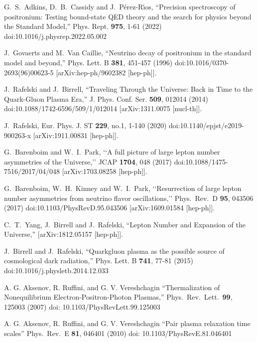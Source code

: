 \documentclass[universe,article,submit,moreauthors,pdftex,a4paper]{Definitions/mdpi}
\begin{document}
\begin{thebibliography}{99}
G.~S.~Adkins, D.~B.~Cassidy and J.~P\'erez-R\'\i{}os,
``Precision spectroscopy of positronium: Testing bound-state QED theory and the search for physics beyond the Standard Model,''
Phys. Rept. \textbf{975}, 1-61 (2022)
doi:10.1016/j.physrep.2022.05.002

J.~Govaerts and M.~Van Caillie,
``Neutrino decay of positronium in the standard model and beyond,''
Phys. Lett. B \textbf{381}, 451-457 (1996)
doi:10.1016/0370-2693(96)00623-5
[arXiv:hep-ph/9602382 [hep-ph]].

J.~Rafelski and J.~Birrell,
``Traveling Through the Universe: Back in Time to the Quark-Gluon Plasma Era,''
J. Phys. Conf. Ser. \textbf{509}, 012014 (2014)
doi:10.1088/1742-6596/509/1/012014
[arXiv:1311.0075 [nucl-th]].

J.~Rafelski,
Eur. Phys. J. ST \textbf{229}, no.1, 1-140 (2020)
doi:10.1140/epjst/e2019-900263-x
[arXiv:1911.00831 [hep-ph]].

G.~Barenboim and W.~I.~Park,
\lq\lq A full picture of large lepton number asymmetries of the Universe,\rq\rq
  JCAP {\bf 1704}, 048 (2017)
  doi:10.1088/1475-7516/2017/04/048
  [arXiv:1703.08258 [hep-ph]].

 G.~Barenboim, W.~H.~Kinney and W.~I.~Park,
 \lq\lq Resurrection of large lepton number asymmetries from neutrino flavor oscillations,\rq\rq
  Phys.\ Rev.\ D {\bf 95}, 043506 (2017)
  doi:10.1103/PhysRevD.95.043506
  [arXiv:1609.01584 [hep-ph]].


C.~T.~Yang, J.~Birrell and J.~Rafelski,
``Lepton Number and Expansion of the Universe,''
[arXiv:1812.05157 [hep-ph]].

J.~Birrell and J.~Rafelski,
``Quark\textendash{}gluon plasma as the possible source of cosmological dark radiation,''
Phys. Lett. B \textbf{741}, 77-81 (2015)
doi:10.1016/j.physletb.2014.12.033

A. G. Aksenov, R. Ruffini, and G. V. Vereshchagin
``Thermalization of Nonequilibrium Electron-Positron-Photon Plasmas,''
Phys.\ Rev.\ Lett.\ \textbf{99}, 125003 (2007) 
doi: 10.1103/PhysRevLett.99.125003

A. G. Aksenov, R. Ruffini, and G. V. Vereshchagin
``Pair plasma relaxation time scales''
Phys.\ Rev.\ E \textbf{81}, 046401 (2010)
doi: 10.1103/PhysRevE.81.046401

\end{thebibliography}

\end{document}
